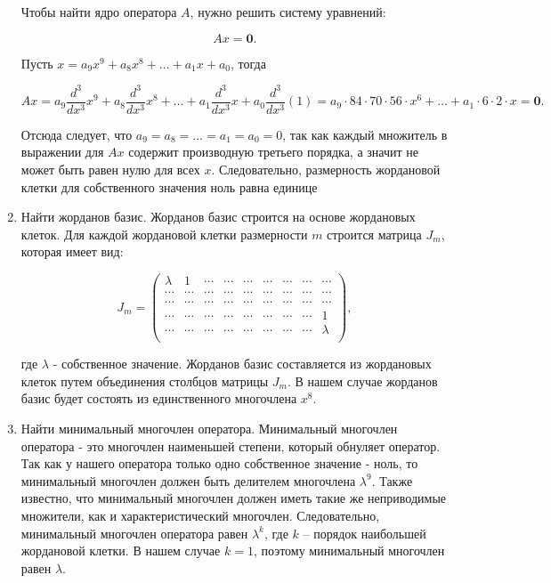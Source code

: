 \begin{enumerate}
    Чтобы найти ядро оператора $A$, нужно решить систему уравнений:

    \[ Ax = \mathbf{0}. \]

    Пусть $x = a_9 x^9 + a_8 x^8 + \dots + a_1 x + a_0$, тогда

    \[ Ax = a_9 \frac{d^3}{dx^3} x^9 + a_8 \frac{d^3}{dx^3} x^8 + \dots + a_1 \frac{d^3}{dx^3} x + a_0 \frac{d^3}{dx^3}
    (1) = a_9 \cdot 84\cdot70\cdot56\cdot x^6 + \dots + a_1 \cdot6\cdot2\cdot x = \mathbf{0}. \]

    Отсюда следует, что $a_9 = a_8 = \dots = a_1 = a_0 = 0$, так как каждый множитель в выражении для $Ax$ содержит
    производную третьего порядка, а значит не может быть равен нулю для всех $x$.
    Следовательно, размерность жордановой клетки для собственного значения ноль равна единице
    \item Найти жорданов базис.
    Жорданов базис строится на основе жордановых клеток.
    Для каждой жордановой клетки
    размерности $m$ строится матрица $J_m$, которая имеет вид:

    \[
        J_m = \begin{pmatrix}
                  \lambda & 1      & \cdots & \cdots & \cdots & \cdots & \cdots & \cdots & \cdots  \\
                  \cdots  & \cdots & \cdots & \cdots & \cdots & \cdots & \cdots & \cdots & \cdots  \\
                  \cdots  & \cdots & \cdots & \cdots & \cdots & \cdots & \cdots & \cdots & \cdots  \\
                  \cdots  & \cdots & \cdots & \cdots & \cdots & \cdots & \cdots & \cdots & 1       \\
                  \cdots  & \cdots & \cdots & \cdots & \cdots & \cdots & \cdots & \cdots & \lambda \\
        \end{pmatrix},
    \]

    где $\lambda$ - собственное значение.
    Жорданов базис составляется из жордановых клеток путем объединения столбцов матрицы $J_m$.
    В нашем случае жорданов базис будет состоять из единственного многочлена $x^8$.
    \item Найти минимальный многочлен оператора.
    Минимальный многочлен оператора - это многочлен наименьшей степени, который обнуляет оператор.
    Так как у нашего оператора только одно собственное значение - ноль, то минимальный многочлен должен быть
    делителем многочлена $\lambda^9$.
    Также известно, что минимальный многочлен должен иметь такие же неприводимые множители, как и
    характеристический многочлен.
    Следовательно, минимальный многочлен оператора равен $\lambda^k$, где $k$ -- порядок наибольшей жордановой
    клетки.
    В нашем случае $k=1$, поэтому минимальный многочлен равен $\lambda$.
\end{enumerate}